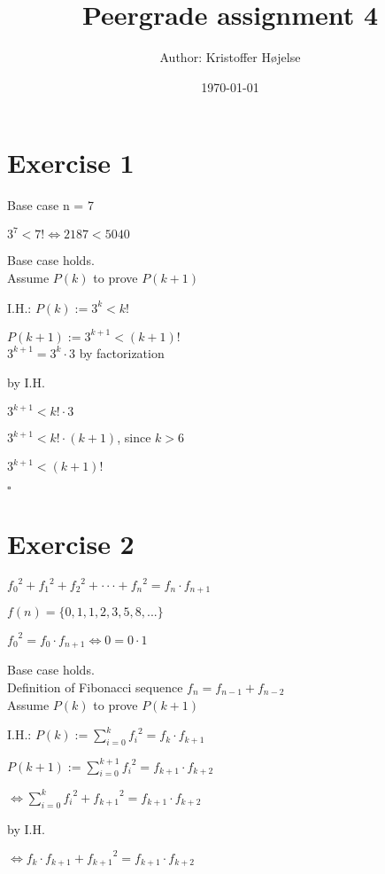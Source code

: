 \documentclass[a4paper,11pt]{article}
\title{Peergrade assignment 4}
\author{Author: Kristoffer Højelse}
\date{\today}
\newcommand*{\QEDB}{\hfill\ensuremath{\square}}%
\begin{document}
 

\maketitle

\section*{Exercise 1}

Base case n = 7

$3^7 < 7! \iff 2187 < 5040$

Base case holds.\\

\noindent Assume $P(k)$ to prove $P(k+1)$

I.H.: $P(k) := 3^k < k!$

$P(k+1) := 3^{k+1} < (k+1)!$\\

\noindent $3^{k+1} = 3^k \cdot 3$ by factorization

by I.H.

$3^{k+1} < k! \cdot 3$

$3^{k+1} < k! \cdot (k+1)$, since $k>6$

$3^{k+1} < (k+1)!$

\QEDB

\section*{Exercise 2}

${f_0}^2 + {f_1}^2 + {f_2}^2 + \cdot\cdot\cdot + {f_n}^2 = f_n \cdot f_{n+1}$

$f(n) = \{0,1,1,2,3,5,8,...\}$

${f_0}^2 = f_0 \cdot f_{n+1} \iff 0 = 0 \cdot 1$

Base case holds.\\

\noindent Definition of Fibonacci sequence $f_n = f_{n-1} + f_{n-2}$\\

\noindent Assume $P(k)$ to prove $P(k+1)$

I.H.: $P(k) := \sum_{i=0}^k {f_i}^2 = f_k \cdot f_{k+1}$

$P(k+1) := \sum_{i=0}^{k+1} {f_i}^2 = f_{k+1} \cdot f_{k+2}$

$\iff \sum_{i=0}^k {f_i}^2 + {f_{k+1}}^2 = f_{k+1} \cdot f_{k+2}$

by I.H.

$\iff f_k \cdot f_{k+1} + {f_{k+1}}^2 = f_{k+1} \cdot f_{k+2}$
\end{document}
